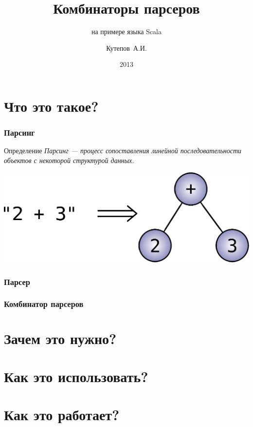 \documentclass{beamer}
\title{Комбинаторы парсеров}
\subtitle{на примере языка Scala}
\author{Кутепов~А.И.}
\date{2013}
\begin{document}
\begin{frame}
  \titlepage
\end{frame}

\begin{frame}
  \tableofcontents
\end{frame}

\section{Что это такое?}

\begin{frame}
  \frametitle{Парсинг}

  \pause
  \begin{block}{Определение}
    \textit{Парсинг --- процесс сопоставления линейной
      последовательности объектов с некоторой структурой данных.}
  \end{block}

  \pause
  \includegraphics[scale=0.50]{images/parsing-example.eps}
\end{frame}

\begin{frame}
  \frametitle{Парсер}
\end{frame}

\begin{frame}
  \frametitle{Комбинатор парсеров}
\end{frame}

\section{Зачем это нужно?}

\section{Как это использовать?}

\section{Как это работает?}
\end{document}
